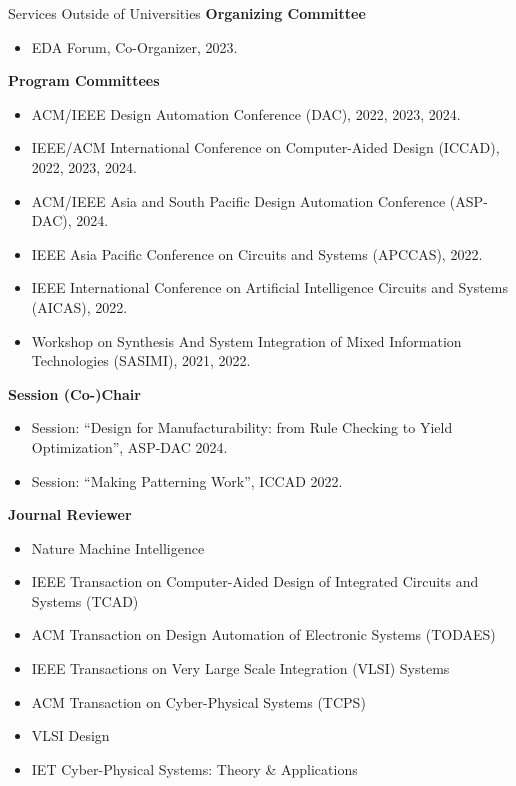 
\begin{rSection}{Services Outside of Universities}
\textbf{Organizing Committee}
\begin{itemize}
	\item EDA Forum, Co-Organizer, 2023.
\end{itemize}

\textbf{Program Committees}
\begin{itemize}
    \item ACM/IEEE Design Automation Conference (DAC), 2022, 2023, 2024.
    \item IEEE/ACM International Conference on Computer-Aided Design (ICCAD), 2022, 2023, 2024.
    \item ACM/IEEE Asia and South Pacific Design Automation Conference (ASP-DAC), 2024.
    \item IEEE Asia Pacific Conference on Circuits and Systems (APCCAS), 2022.
    \item IEEE International Conference on Artificial Intelligence Circuits and Systems (AICAS), 2022.
    \item Workshop on Synthesis And System Integration of Mixed Information Technologies (SASIMI), 2021, 2022.
\end{itemize}

\textbf{Session (Co-)Chair}
\begin{itemize}
	\item Session: ``Design for Manufacturability: from Rule Checking to Yield Optimization'', ASP-DAC 2024.
    \item Session: ``Making Patterning Work'', ICCAD 2022.
\end{itemize}

\textbf{Journal Reviewer}
\begin{itemize}
    \item Nature Machine Intelligence
    \item IEEE Transaction on Computer-Aided Design of Integrated Circuits and Systems (TCAD)
    \item ACM Transaction on Design Automation of Electronic Systems (TODAES)
    \item IEEE Transactions on Very Large Scale Integration (VLSI) Systems
    \item ACM Transaction on Cyber-Physical Systems (TCPS)
    \item VLSI Design
    \item IET Cyber-Physical Systems: Theory \& Applications
\end{itemize}


\end{rSection}
